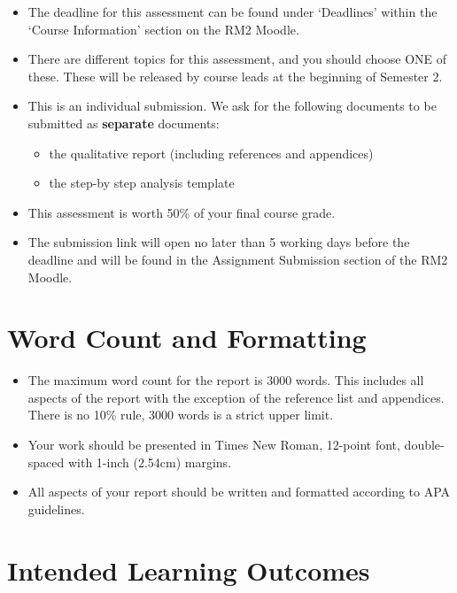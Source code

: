 \documentclass[
  english,
  letterpaper,
  DIV=11,
  numbers=noendperiod]{scrreprt}
\providecommand{\tightlist}{%
  \setlength{\itemsep}{0pt}\setlength{\parskip}{0pt}}
\begin{document}
\begin{itemize}
\item
  The deadline for this assessment can be found under `Deadlines' within
  the `Course Information' section on the RM2 Moodle.
\item
  There are different topics for this assessment, and you should choose
  ONE of these. These will be released by course leads at the beginning
  of Semester 2.
\item
  This is an individual submission. We ask for the following documents
  to be submitted as \textbf{separate} documents:

  \begin{itemize}
  \tightlist
  \item
    the qualitative report (including references and appendices)
  \item
    the step-by step analysis template
  \end{itemize}
\item
  This assessment is worth 50\% of your final course grade.
\item
  The submission link will open no later than 5 working days before the
  deadline and will be found in the Assignment Submission section of the
  RM2 Moodle.
\end{itemize}

\section{Word Count and Formatting}\label{word-count-and-formatting-1}

\begin{itemize}
\item
  The maximum word count for the report is 3000 words. This includes all
  aspects of the report with the exception of the reference list and
  appendices. There is no 10\% rule, 3000 words is a strict upper limit.
\item
  Your work should be presented in Times New Roman, 12-point font,
  double-spaced with 1-inch (2.54cm) margins.
\item
  All aspects of your report should be written and formatted according
  to APA guidelines.
\end{itemize}

\section{Intended Learning Outcomes}\label{report_ILOs}
\end{document}
